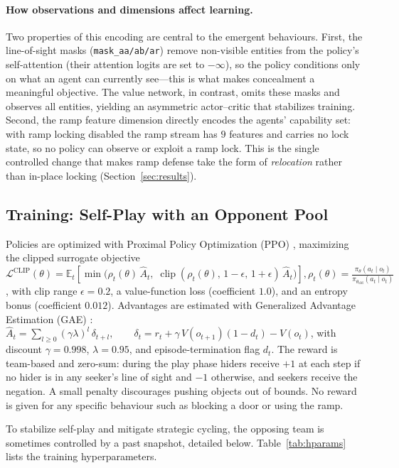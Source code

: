 \documentclass{article}
\begin{document}
\paragraph{How observations and dimensions affect learning.}
Two properties of this encoding are central to the emergent behaviours. First,
the line-of-sight masks (\texttt{mask\_aa/ab/ar}) remove non-visible entities
from the policy's self-attention (their attention logits are set to $-\infty$),
so the policy conditions only on what an agent can currently see---this is what
makes concealment a meaningful objective. The value network, in contrast, omits
these masks and observes all entities, yielding an asymmetric actor--critic that
stabilizes training. Second, the ramp feature dimension directly encodes the
agents' capability set: with ramp locking disabled the ramp stream has $9$
features and carries no lock state, so no policy can observe or exploit a ramp
lock. This is the single controlled change that makes ramp defense take the form
of \emph{relocation} rather than in-place locking (Section~\ref{sec:results}).

\subsection{Training: Self-Play with an Opponent Pool}
Policies are optimized with Proximal Policy Optimization (PPO)
\citep{schulman2017ppo}, maximizing the clipped surrogate objective $\mathcal{L}^{\text{CLIP}}(\theta) = \mathbb{E}_t\!\left[
    \min\!\big(\rho_t(\theta)\,\hat{A}_t,\;
    \operatorname{clip}(\rho_t(\theta),\,1-\epsilon,\,1+\epsilon)\,\hat{A}_t\big)\right],
  \rho_t(\theta)=\frac{\pi_\theta(a_t\mid o_t)}{\pi_{\theta_{\text{old}}}(a_t\mid o_t)}$, with clip range $\epsilon=0.2$, a value-function loss (coefficient $1.0$), and an
entropy bonus (coefficient $0.012$). Advantages are estimated with Generalized
Advantage Estimation (GAE) \citep{schulman2016gae}: 
$ \hat{A}_t = \sum_{l\ge 0}(\gamma\lambda)^{l}\,\delta_{t+l},
  \qquad
  \delta_t = r_t + \gamma\,V(o_{t+1})(1-d_t) - V(o_t)$, with discount $\gamma=0.998$, $\lambda=0.95$, and episode-termination flag $d_t$.
The reward is team-based and zero-sum: during the play phase hiders receive $+1$
at each step if no hider is in any seeker's line of sight and $-1$ otherwise,
and seekers receive the negation. A small penalty discourages pushing objects
out of bounds. No reward is given for any specific behaviour such as blocking a
door or using the ramp.

To stabilize self-play and mitigate strategic cycling, the opposing team is
sometimes controlled by a past snapshot, detailed below.
Table~\ref{tab:hparams} lists the training hyperparameters.
\end{document}
